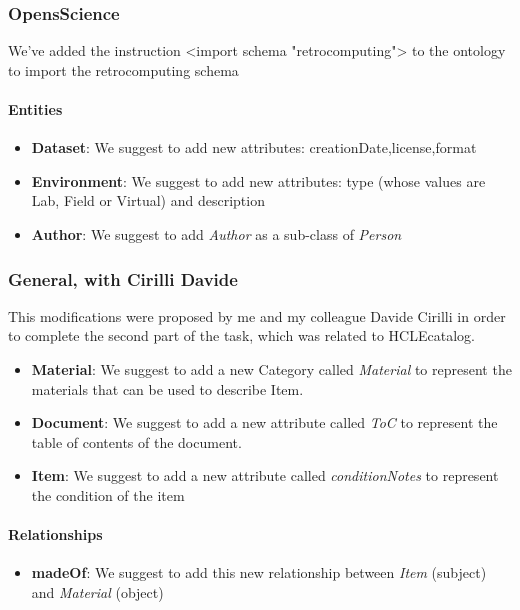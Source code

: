 \subsubsection{OpensScience}

We've added the instruction <import schema "retrocomputing"> to the ontology to import the retrocomputing schema

\paragraph{Entities}
\begin{itemize}
    \item \textbf{Dataset}: We suggest to add new attributes: creationDate,license,format
    \item \textbf{Environment}: We suggest to add new attributes: type (whose values are Lab, Field or Virtual) and description
    \item \textbf{Author}: We suggest to add \textit{Author} as a sub-class of \textit{Person}
\end{itemize}

\subsubsection{General, with Cirilli Davide}
This modifications were proposed by me and my colleague Davide Cirilli in order to complete the second part of the task, which was related to HCLEcatalog.
\begin{itemize}
    \item \textbf{Material}: We suggest to add a new Category called \textit{Material} to represent the materials that can be used to describe Item.
    \item \textbf{Document}: We suggest to add a new attribute called \textit{ToC} to represent the table of contents of the document.
    \item \textbf{Item}: We suggest to add a new attribute called \textit{conditionNotes} to represent the condition of the item
\end{itemize}
\paragraph{Relationships}
\begin{itemize}
    \item \textbf{madeOf}: We suggest to add this new relationship between \textit{Item} (subject) and \textit{Material} (object)
\end{itemize}

